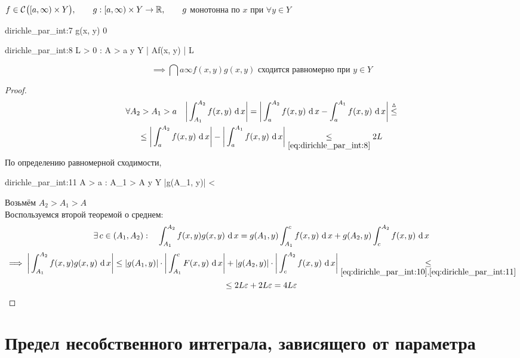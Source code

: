 \begin{theorem}
	$ f \in \mathcal{C}^{} \big( {[a, \infty) \times Y} \big) , \qquad g : [a, \infty) \times Y \to \mathbb{R}, \qquad g $ монотонна по $ x $ при $ \forall y \in Y $
	\begin{equ}{dirichle_par_int:7}
		g(x, y)  0
	\end{equ}
	\begin{equ}{dirichle_par_int:8}
		\exist L > 0 : \quad \forall A > a \quad \forall y \in Y \quad \bigg| A{f(x, y)} \bigg| \le L
	\end{equ}
	$$ \implies \dint{a}\infty{f(x, y)g(x, y)} \text{ сходится равномерно при } y \in Y $$
\end{theorem}

\begin{proof}
	\begin{multline}\lbl{dirichle_par_int:10}
		\forall A_2 > A_1 > a \quad \bigg| \dint{A_1}{A_2}{f(x, y)} \bigg| = \bigg| \dint{a}{A_2}{f(x, y)} - \dint{a}{A_1}{f(x, y)} \bigg| \trile \\
		\le \bigg| \dint{a}{A_2}{f(x, y)} \bigg| - \bigg| \dint{a}{A_1}{f(x, y)} \bigg| \underset{\eref{dirichle_par_int:8}}\le 2L
	\end{multline}
	По определению равномерной сходимости,
	\begin{equ}{dirichle_par_int:11}
		 \implies \exist A > a : \quad \forall A_1 > A \quad \forall y \in Y \quad |g(A_1, y)| < \veps
	\end{equ}
	Возьмём $ A_2 > A_1 > A $ \\
	Воспользуемся второй теоремой о среднем:
	$$ \exists\, c \in (A_1, A_2) : \quad \int_{A_1}^{A_2} {f(x, y)g(x, y)} \, \operatorname{d} {x} = g(A_1, y)\int_{A_1}^{c} {f(x, y)} \, \operatorname{d} {x} + g(A_2, y)\int_{c}^{A_2} {f(x, y)} \, \operatorname{d} {x} $$
	\begin{multline*}
		\implies \bigg| \dint{A_1}{A_2}{f(x, y)g(x, y)} \bigg| \le |g(A_1, y)| \cdot \bigg| \dint{A_1}c{F(x, y)} \bigg| + |g(A_2, y)| \cdot \bigg| \dint{c}{A_2}{f(x, y)} \bigg| \underset{\eref{dirichle_par_int:10}, \eref{dirichle_par_int:11}}\le \\
		\le 2L\veps + 2L\veps = 4L\veps
	\end{multline*}
\end{proof}

\section{Предел несобственного интеграла, зависящего от параметра}

